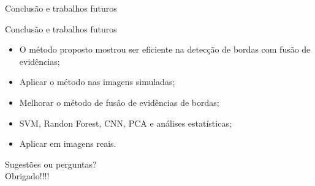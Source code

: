 \documentclass[10pt]{beamer}
\begin{document}
\begin{frame}{Conclusão e trabalhos futuros}
\begin{alertblock}{Conclusão e trabalhos futuros}
\begin{itemize}
\item O método proposto mostrou ser eficiente na detecção de bordas com fusão de evidências;
\item Aplicar o método nas imagens simuladas;
\item Melhorar o método de fusão de evidências de bordas;
\item SVM, Randon Forest, CNN, PCA e análises estatísticas;
\item Aplicar em imagens reais.
\end{itemize}
\end{alertblock}
\end{frame}

\begin{frame}[standout]
  Sugestões ou perguntas?\\
  Obrigado!!!!
\end{frame}
\end{document}
